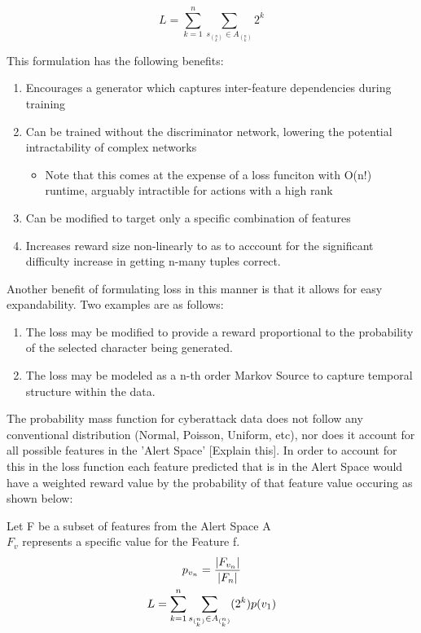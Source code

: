 \begin{equation}
L = \sum_{k=1}^{n}\sum_{s_{{(^n_k)}} \in A_{(^n_k)}} 2^k
\end{equation}

This formulation has the following benefits:
\begin{enumerate}
	\item Encourages a generator which captures inter-feature dependencies during training
	\item Can be trained without the discriminator network, lowering the potential intractability of complex networks
	\begin{itemize}
		\item Note that this comes at the expense of a loss funciton with O(n!) runtime, arguably intractible for actions with a high rank
	\end{itemize}
	\item Can be modified to target only a specific combination of features
	\item Increases reward size non-linearly to as to acccount for the significant difficulty increase in getting n-many tuples correct.
\end{enumerate}

Another benefit of formulating loss in this manner is that it allows for easy expandability. Two examples are as follows: 
\begin{enumerate}
	\item The loss may be modified to provide a reward proportional to the probability of the selected character being generated. 
	\item The loss may be modeled as a n-th order Markov Source to capture temporal structure within the data. 
\end{enumerate}

The probability mass function for cyberattack data does not follow any conventional distribution (Normal, Poisson, Uniform, etc), nor does it account for all possible features in the 'Alert Space' [Explain this]. In order to account for this in the loss function each feature predicted that is in the Alert Space would have a weighted reward value by the probability of that feature value occuring as shown below:

{
	\centering
	Let F be a subset of features from the Alert Space A\\
	$F_v$ represents a specific value for the Feature f.\\
}
\begin{gather}
p_{v_n} = {|F_{v_n}| \over |F_n|}\\
L = \sum_{k=1}^{n}\sum_{s_{{(^n_k)}} \in A_{(^n_k)}} (2^k)p(v_1)
\end{gather}


